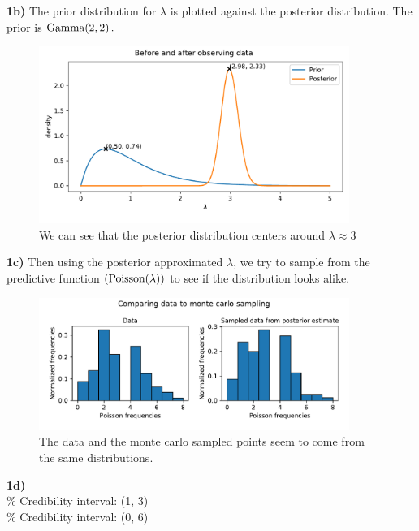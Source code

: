 \documentclass[12pt]{article}
\begin{document}
    \textbf{1b)} The prior distribution for $\lambda$ is plotted against the posterior distribution. The prior is $\operatorname{Gamma({2,2})}.$
    \begin{figure}[H]
        \centering
        \includegraphics[width=0.9\textwidth]{1b.pdf}
        \caption{We can see that the posterior distribution centers around $\lambda \approx 3$}
    \end{figure}

    \textbf{1c)} Then using the posterior approximated $\lambda$, we try to sample from the predictive function $(\operatorname{Poisson({\lambda})})$ to see if the distribution looks alike. 
    \begin{figure}[H]
        \centering
        \includegraphics[width=0.9\textwidth]{1c.pdf}
        \caption{The data and the monte carlo sampled points seem to come from the same distributions.}
    \end{figure}

    \textbf{1d)} \\  
    \% Credibility interval: (1, 3) \\
    \% Credibility interval: (0, 6)
\end{document}
